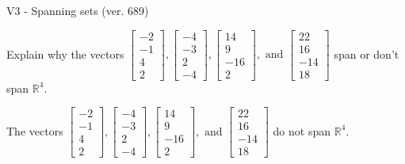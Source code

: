 \begin{exercise}
  \begin{exerciseTitle}V3 - Spanning sets (ver. 689)\end{exerciseTitle}
  \begin{exerciseStatement}
    Explain why the vectors \(\left[\begin{array}{r}
-2 \\
-1 \\
4 \\
2
\end{array}\right] , \left[\begin{array}{r}
-4 \\
-3 \\
2 \\
-4
\end{array}\right] , \left[\begin{array}{r}
14 \\
9 \\
-16 \\
2
\end{array}\right] , \text{ and } \left[\begin{array}{r}
22 \\
16 \\
-14 \\
18
\end{array}\right]\) span or don't span \(\mathbb{R}^4\). 
	


  \end{exerciseStatement}
  \begin{exerciseAnswer}
   The vectors \(\left[\begin{array}{r}
-2 \\
-1 \\
4 \\
2
\end{array}\right] , \left[\begin{array}{r}
-4 \\
-3 \\
2 \\
-4
\end{array}\right] , \left[\begin{array}{r}
14 \\
9 \\
-16 \\
2
\end{array}\right] , \text{ and } \left[\begin{array}{r}
22 \\
16 \\
-14 \\
18
\end{array}\right]\) 
  	 do not  
	span \(\mathbb{R}^4\).
  


  \end{exerciseAnswer}
\end{exercise}